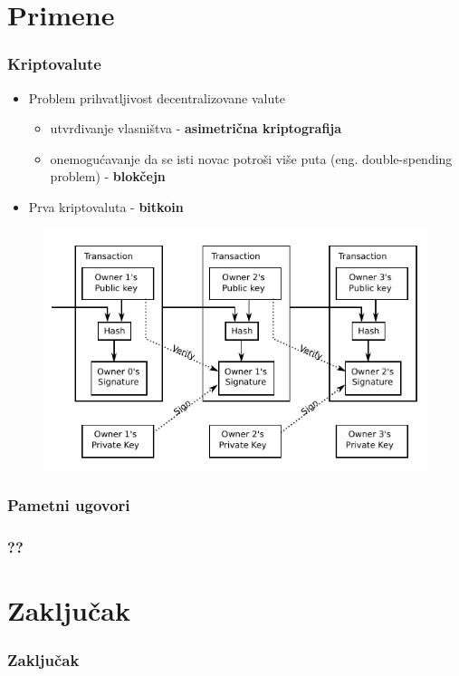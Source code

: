 \documentclass{beamer}
\begin{document}
\section{Primene}

\begin{frame}[fragile]\frametitle{Kriptovalute}
	\begin{itemize}
		\item Problem prihvatljivost decentralizovane valute
		\begin{itemize}
			\item utvrđivanje vlasništva - \textbf{asimetrična kriptografija}
			\item onemogućavanje da se isti novac potroši više puta (eng. double-spending problem) - \textbf{blokčejn}
		\end{itemize}
		\item Prva kriptovaluta - \textbf{bitkoin}
	\end{itemize}
	\begin{figure}[H]
		\includegraphics[scale=0.5]{Bitcoin_Transaction_Visual.pdf}
	\end{figure}
\end{frame}

\begin{frame}[fragile]\frametitle{Pametni ugovori}
	
\end{frame}

\begin{frame}[fragile]\frametitle{??}
	
\end{frame}


\section{Zaključak}

\begin{frame}[fragile]\frametitle{Zaključak}
	
\end{frame}
\end{document}
